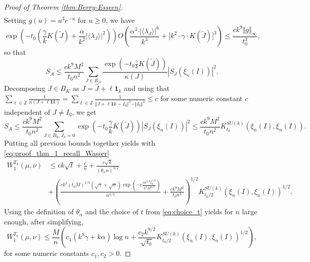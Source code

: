 \documentclass[10pt,11pt]{amsart}%
\begin{document}
\begin{proof}[Proof of Theorem \ref{thm:Berry-Esseen}]
\begin{align*}
\end{align*}
Setting $g(u)=u^3e^{-u}$ for $u\geq 0$, we have 
$$\exp\left(-t_0\left(\frac{\gamma}{k}K(\tilde{J})+\frac{\alpha}{k^2}\vert\langle\lambda_J\rangle\vert^2\right)\right)O\left(\frac{\alpha^{3}\cdot\vert\langle \lambda_J\rangle\vert^6}{k^3}+\Big[k^2 \cdot \gamma\cdot K(\tilde{J})\Big]^{3}\right)\leq \frac{ck^9\Vert g\Vert_{\infty}}{t_0^3},$$
so that 
$$S_A\leq \frac{ck^9M^2}{t_0n^2}\sum_{J\in R_{A}}\frac{\exp\left(-t_0\frac{\gamma}{k}K(\tilde{J})\right)}{\kappa(J)}\left\vert S_{J}(\xi_n(I))\right\vert^2.$$
Decomposing $J\in B_{K}$ as $J=\hat{J}+\ell \mathbf{1}_k$ and using that $\sum_{\ell\in \mathbb{Z}}\frac{1}{\kappa(J+\ell\mathbf{1}k)}=\sum_{\ell\in \mathbb{Z}}\frac{1}{\Vert J+\ell\mathbf{1}k-\tilde{I_0}\Vert^2-\Vert \tilde{I}_0\Vert^2}\leq c$ for some numeric constant $c$ independent of $J\not=I_0$, we get 
$$S_A\leq \frac{ck^9M^2}{t_0n^2}\sum_{J\in B_k,J_k=0}\exp\left(-t_0\frac{\gamma}{k}K(\tilde{J})\right)\left\vert S_{J}(\xi_n(I))\right\vert^2\leq\frac{ck^9M^2}{t_0n^2}K_{t_0}^{SU(k)}(\xi_n(I),\xi_n(I)).$$
Putting all previous bounds together yields with \eqref{eq:proof_thm_1_recall_Wasser}
\begin{align}
W_{1}^{T_k}(\mu,\nu)&\leq ck\sqrt{t}+\frac{c}{n}+\frac{c\sqrt{k}}{(\theta_{\alpha}n)^{3/2}}\nonumber\\
&+\left(\frac{ck^2(t_0M)^{1/3}(\sqrt{\gamma}+\sqrt{\alpha})\exp\left(-c\frac{cn^{2/3}t_0^{1/3}}{k^3M^{2/3}} \right)}{n^{1/3}}+\frac{ck^9M^2}{t_0n^2}\right)^{1/2}K_{t_0/2}^{SU(k)}(\xi_n(I),\xi_n(I))^{1/2}.\label{eq:exact_bound}
\end{align}
Using the definition of $\theta_{\alpha}$ and the choice of $t$ from \eqref{eq:choice_t} yields for $n$ large enough, after simplifying,
$$W_{1}^{T_k}(\mu,\nu)\leq \frac{M}{n}\left(c_1(k^8\gamma+k\alpha)\log n+\frac{c_2k^{9/2}}{\sqrt{t_0}}K_{t_0/2}^{SU(k)}(\xi_n(I),\xi_n(I))^{1/2}\right),$$
for some numeric constants $c_1,c_2>0$.
\end{proof}
\end{document}
